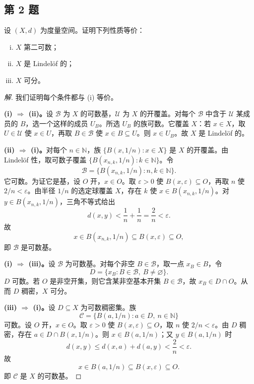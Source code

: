 \documentclass[11pt,a4paper]{article}
\newcommand{\N}{\mathbb{N}}
\theoremstyle{definition}
\newenvironment{solution}{\begin{proof}[解]}{\end{proof}}
\begin{document}
\subsection{第 2 题}

设 $(X, d)$ 为度量空间。证明下列性质等价：
\begin{enumerate}[(i)]
  \item $X$ 第二可数；
  \item $X$ 是 Lindel\"of 的；
  \item $X$ 可分。
\end{enumerate}

\begin{solution}
我们证明每个条件都与 (i) 等价。

\textbf{(i) $\Rightarrow$ (ii)。}设 $\mathcal{B}$ 为 $X$ 的可数基，$\mathcal{U}$ 为 $X$ 的开覆盖。对每个 $\mathcal{B}$ 中含于 $\mathcal{U}$ 某成员的 $B$，选一个这样的成员 $U_B$。所选 $U_B$ 的族可数。它覆盖 $X$：若 $x \in X$，取 $U \in \mathcal{U}$ 使 $x \in U$，再取 $B \in \mathcal{B}$ 使 $x \in B \subseteq U$。则 $x \in U_B$。故 $X$ 是 Lindel\"of 的。

\textbf{(ii) $\Rightarrow$ (i)。}对每个 $n \in \N$，族 $\{B(x,1/n) : x \in X\}$ 是 $X$ 的开覆盖。由 Lindel\"of 性，取可数子覆盖 $\{B(x_{n,k},1/n) : k \in \N\}$。令
\[
  \mathcal{B} = \{B(x_{n,k},1/n) : n,k \in \N\}.
\]
它可数。为证它是基，设 $O$ 开，$x \in O$。取 $\varepsilon > 0$ 使 $B(x,\varepsilon) \subseteq O$，再取 $n$ 使 $2/n < \varepsilon$。由半径 $1/n$ 的选定球覆盖 $X$，存在 $k$ 使 $x \in B(x_{n,k},1/n)$。对 $y \in B(x_{n,k},1/n)$，三角不等式给出
\[
  d(x,y) < \frac1n + \frac1n = \frac2n < \varepsilon.
\]
故
\[
  x \in B(x_{n,k},1/n) \subseteq B(x,\varepsilon) \subseteq O,
\]
即 $\mathcal{B}$ 是可数基。

\textbf{(i) $\Rightarrow$ (iii)。}设 $\mathcal{B}$ 为可数基。对每个非空 $B \in \mathcal{B}$，取一点 $x_B \in B$，令
\[
  D = \{x_B : B \in \mathcal{B},\ B \ne \varnothing\}.
\]
$D$ 可数。若 $O$ 是非空开集，则它含某非空基本开集 $B \in \mathcal{B}$，故 $x_B \in D \cap O$。从而 $D$ 稠密，$X$ 可分。

\textbf{(iii) $\Rightarrow$ (i)。}设 $D \subseteq X$ 为可数稠密集。族
\[
  \mathcal{C} = \{B(a,1/n) : a \in D,\ n \in \N\}
\]
可数。设 $O$ 开，$x \in O$。取 $\varepsilon > 0$ 使 $B(x,\varepsilon) \subseteq O$，取 $n$ 使 $2/n < \varepsilon$。由 $D$ 稠密，存在 $a \in D \cap B(x,1/n)$。则 $x \in B(a,1/n)$；又 $y \in B(a,1/n)$ 时
\[
  d(x,y) \le d(x,a) + d(a,y) < \frac2n < \varepsilon.
\]
故
\[
  x \in B(a,1/n) \subseteq B(x,\varepsilon) \subseteq O.
\]
即 $\mathcal{C}$ 是 $X$ 的可数基。
\end{solution}
\end{document}

